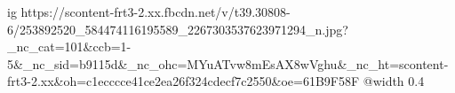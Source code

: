  
 
 
 
 

\ifcmt
  ig https://scontent-frt3-2.xx.fbcdn.net/v/t39.30808-6/253892520_584474116195589_2267303537623971294_n.jpg?_nc_cat=101&ccb=1-5&_nc_sid=b9115d&_nc_ohc=MYuATvw8mEsAX8wVghu&_nc_ht=scontent-frt3-2.xx&oh=c1ecccce41ce2ea26f324cdecf7c2550&oe=61B9F58F
  @width 0.4
\fi
